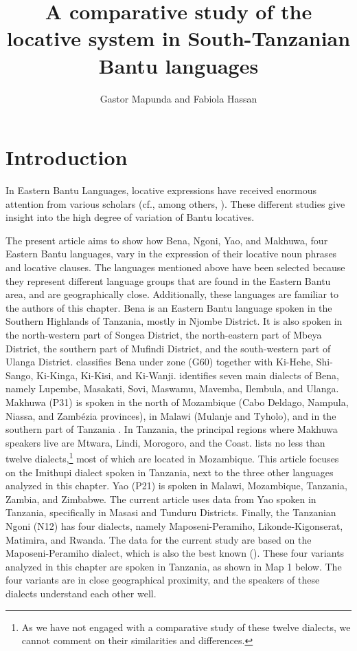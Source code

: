 \documentclass[output=paper ]{langscibook}
\author{Gastor Mapunda\orcid{}\affiliation{University of Dar es Salaam} and
        Fabiola Hassan\orcid{}\affiliation{University of Dodoma}}
\title[The locative system in South-Tanzanian Bantu languages]{A comparative study of the locative system in South-Tanzanian Bantu languages}
\begin{document}
\maketitle 

\settowidth\jamwidth{[Makhuwa]}

\section{Introduction}\label{sec:mapunda:1} %

In Eastern Bantu Languages, locative expressions have received enormous attention from various scholars (cf., among others, \citealt{Harries1965, Rugemalira2004, Buell2007, Marten2012, Barlew2013, MartenvanderWal2014, Guérois2016, ZellerForthcoming}). These different studies give insight into the high degree of variation of Bantu locatives. 

  The present article aims to show how Bena, Ngoni, Yao, and Makhuwa, four Eastern Bantu languages, vary in the expression of their locative noun phrases and locative clauses. The languages mentioned above have been selected because they represent different language groups that are found in the Eastern Bantu area, and are geographically close. Additionally, these languages are familiar to the authors of this chapter. Bena is an Eastern Bantu language spoken in the Southern Highlands of Tanzania, mostly in Njombe District. It is also spoken in the north-western part of Songea District, the north-eastern part of Mbeya District, the southern part of Mufindi District, and the south-western part of Ulanga District. \citet{Guthrie1971} classifies Bena under zone (G60) together with Ki-Hehe, Shi-Sango, Ki-Kinga, Ki-Kisi, and Ki-Wanji. \citet[115]{Chaula1989} identifies seven main dialects of Bena, namely Lupembe, Masakati, Sovi, Maswamu, Mavemba, Ilembula, and Ulanga. Makhuwa (P31) is spoken in the north of Mozambique (Cabo Deldago, Nampula, Niassa, and Zambézia provinces), in Malawi (Mulanje and Tyholo), and in the southern part of Tanzania \citep{Kröger2005}. In Tanzania, the principal regions where Makhuwa speakers live are Mtwara, Lindi, Morogoro, and the Coast. \citet{Ismail2000} lists no less than twelve dialects,\footnote{{As we have not engaged with a comparative study of these twelve dialects, we cannot comment on their similarities and differences.}} most of which are located in Mozambique. This article focuses on the Imithupi dialect spoken in Tanzania, next to the three other languages analyzed in this chapter. Yao (P21) is spoken in Malawi, Mozambique, Tanzania, Zambia, and Zimbabwe. The current article uses data from Yao spoken in Tanzania, specifically in Masasi and Tunduru Districts. Finally, the Tanzanian Ngoni (N12) has four dialects, namely Maposeni-Peramiho, Likonde-Kigonserat, Matimira, and Rwanda. The data for the current study are based on the Maposeni-Peramiho dialect, which is also the best known (\citealt{Mapunda2015, Ngonyani2003}). These four variants analyzed in this chapter are spoken in Tanzania, as shown in Map 1 below. The four variants are in close geographical proximity, and the speakers of these dialects understand each other well.
\end{document}
